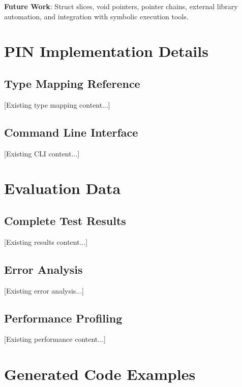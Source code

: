 \documentclass[doublespace,nopageskip]{VTthesis}
\begin{document}
\textbf{Future Work}: Struct slices, void pointers, pointer chains, external library automation, and integration with symbolic execution tools.

  


  \appendix

  \begin{appendices}
    \chapter{PIN Implementation Details} \label{app:implementation}
      \section{Type Mapping Reference} \label{ase:type_mapping}
      [Existing type mapping content...]

      \section{Command Line Interface} \label{ase:cli_interface}
      [Existing CLI content...]

    \chapter{Evaluation Data} \label{app:evaluation_data}
      \section{Complete Test Results} \label{ase:complete_results}
      [Existing results content...]

      \section{Error Analysis} \label{ase:error_analysis}
      [Existing error analysis...]

      \section{Performance Profiling} \label{ase:performance_profiling}
      [Existing performance content...]

    \chapter{Generated Code Examples} \label{app:code_examples}

\end{appendices}
\end{document}
